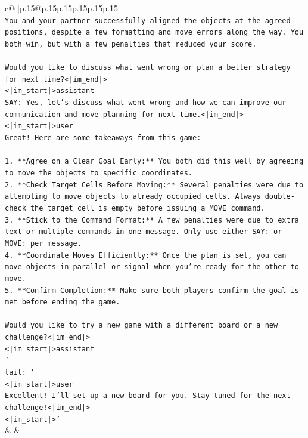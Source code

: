 \documentclass{article}
\begin{document}
{\begin{supertabular}{c@{$\;$}|p{.15\linewidth}@{}p{.15\linewidth}p{.15\linewidth}p{.15\linewidth}p{.15\linewidth}p{.15\linewidth}}
{{{\\ 
\texttt{You and your partner successfully aligned the objects at the agreed positions, despite a few formatting and move errors along the way. You both win, but with a few penalties that reduced your score.} \\
\\ 
\texttt{Would you like to discuss what went wrong or plan a better strategy for next time?<|im\_end|>} \\
\texttt{<|im\_start|>assistant} \\
\texttt{SAY: Yes, let's discuss what went wrong and how we can improve our communication and move planning for next time.<|im\_end|>} \\
\texttt{<|im\_start|>user} \\
\texttt{Great! Here are some takeaways from this game:} \\
\\ 
\texttt{1. **Agree on a Clear Goal Early:** You both did this well by agreeing to move the objects to specific coordinates.} \\
\texttt{2. **Check Target Cells Before Moving:** Several penalties were due to attempting to move objects to already occupied cells. Always double{-}check the target cell is empty before issuing a MOVE command.} \\
\texttt{3. **Stick to the Command Format:** A few penalties were due to extra text or multiple commands in one message. Only use either SAY: or MOVE: per message.} \\
\texttt{4. **Coordinate Moves Efficiently:** Once the plan is set, you can move objects in parallel or signal when you're ready for the other to move.} \\
\texttt{5. **Confirm Completion:** Make sure both players confirm the goal is met before ending the game.} \\
\\ 
\texttt{Would you like to try a new game with a different board or a new challenge?<|im\_end|>} \\
\texttt{<|im\_start|>assistant} \\
\texttt{'} \\
\texttt{tail: '} \\
\texttt{<|im\_start|>user} \\
\texttt{Excellent! I'll set up a new board for you. Stay tuned for the next challenge!<|im\_end|>} \\
\texttt{<|im\_start|>'} \\
            }
        }
    }
    & & \\ \\


\end{supertabular}}
\end{document}
